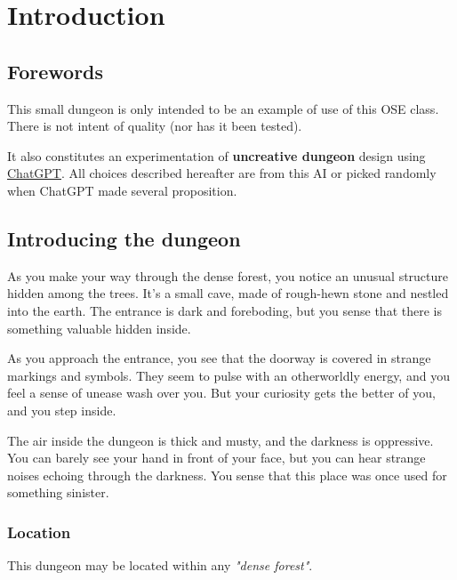 \chapter{Introduction}
\section{Forewords}
This small dungeon is only intended to be an example of use of this OSE class.
There is not intent of quality (nor has it been tested).

It also constitutes an experimentation of \textbf{uncreative dungeon} design using \href{https://chat.openai.com}{ChatGPT}.
All choices described hereafter are from this AI or picked randomly when ChatGPT made several proposition.

\vfill
\pagebreak
\section{Introducing the dungeon}
\begin{highlight} %
  As you make your way through the dense forest, you notice an unusual structure hidden among the trees. 
  It's a small cave, made of rough-hewn stone and nestled into the earth. 
  The entrance is dark and foreboding, but you sense that there is something valuable hidden inside.
  
  As you approach the entrance, you see that the doorway is covered in strange markings and symbols. 
  They seem to pulse with an otherworldly energy, and you feel a sense of unease wash over you. 
  But your curiosity gets the better of you, and you step inside.
  
  The air inside the dungeon is thick and musty, and the darkness is oppressive. 
  You can barely see your hand in front of your face, but you can hear strange noises echoing through the darkness.
  You sense that this place was once used for something sinister.
\end{highlight}

\subsection{Location}
This dungeon may be located within any \emph{"dense forest"}.

